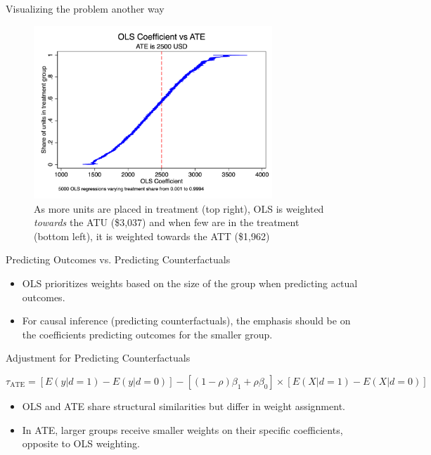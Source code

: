 \documentclass{beamer}
\begin{document}
\begin{frame}{Visualizing the problem another way}
    \begin{figure}
        \centering
        \includegraphics[width=0.8\textwidth]{./lecture_includes/ols_ate.png}
        \caption{As more units are placed in treatment (top right), OLS is weighted \emph{towards} the ATU (\$3,037) and when few are in the treatment (bottom left), it is weighted towards the ATT (\$1,962) }
    \end{figure}
\end{frame}



\begin{frame}{Predicting Outcomes vs. Predicting Counterfactuals}
  \begin{itemize}
    \item OLS prioritizes weights based on the size of the group when predicting actual outcomes.
    \item For causal inference (predicting counterfactuals), the emphasis should be on the coefficients predicting outcomes for the smaller group.
  \end{itemize}
\end{frame}

\begin{frame}{Adjustment for Predicting Counterfactuals}

\tiny
  \[
    \tau_{\text{ATE}} = [E(y|d=1) - E(y|d=0)] - [(1 - \rho)\beta_1 + \rho\beta_0] \times [E(X | d = 1) - E(X | d = 0)]
  \]
  \begin{itemize}
    \item OLS and ATE share structural similarities but differ in weight assignment.
    \item In ATE, larger groups receive smaller weights on their specific coefficients, opposite to OLS weighting.
  \end{itemize}
\end{frame}
\end{document}
